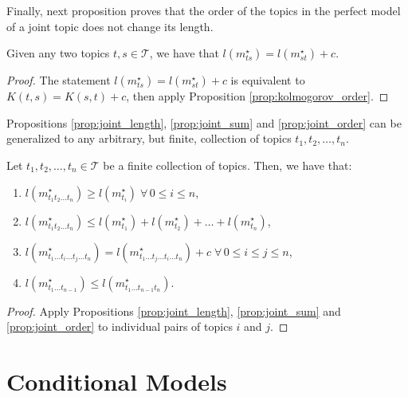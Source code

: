 Finally, next proposition proves that the order of the topics in the perfect model of a joint topic does not change its length.

\begin{proposition}
\label{prop:joint_order}
Given any two topics $t,s \in \mathcal{T}$, we have that $l \left( m_{ts}^{\star} \right) = l \left( m_{st}^{\star} \right) + c$.
\end{proposition}
\begin{proof}
The statement $l \left( m_{ts}^{\star} \right) = l \left( m_{st}^{\star} \right) + c$ is equivalent to $K(t,s) = K(s,t) + c$, then apply Proposition \ref{prop:kolmogorov_order}.
\end{proof}

Propositions \ref{prop:joint_length}, \ref{prop:joint_sum} and \ref{prop:joint_order} can be generalized to any arbitrary, but finite, collection of topics $t_1, t_2, \ldots, t_n$.

\begin{proposition}
\label{prop:joint_multiple_topics}
Let $t_1, t_2, \ldots, t_n \in \mathcal{T}$ be a finite collection of topics. Then, we have that:

\renewcommand{\theenumi}{\roman{enumi}}
\begin{enumerate}
\item $l(m_{t_1 t_2 \ldots t_n}^\star) \geq l(m_ {t_i}^\star) \; \forall \, 0 \leq i \leq n$,
\item $l(m_{t_1 t_2 \ldots t_n}^\star) \leq l(m_ {t_1}^\star) + l(m_ {t_2}^\star) + \ldots + l(m_ {t_n}^\star)$,
\item $l(m_{t_1 \ldots t_i \ldots t_j \ldots t_n}^\star) = l(m_{t_1 \ldots t_j \ldots t_i \ldots t_n}^\star) + c \; \forall \, 0 \leq i \leq j \leq n$,
\item $l(m_{t_1 \ldots t_{n-1}}^\star) \leq l(m_{t_1 \ldots t_{n-1} t_n}^\star)$.
\end{enumerate}
\end{proposition}
\begin{proof}
Apply Propositions \ref{prop:joint_length}, \ref{prop:joint_sum} and \ref{prop:joint_order} to individual pairs of topics $i$ and $j$.
\end{proof}

%
%

\section{Conditional Models}

